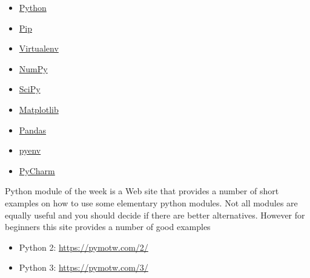 \begin{itemize}
\item \href{https://www.python.org/}{Python}
\item \href{https://pip.pypa.io/en/stable/}{Pip}
\item \href{https://virtualenv.pypa.io/en/stable/}{Virtualenv}
\item \href{http://www.numpy.org/}{NumPy}
\item \href{https://scipy.org/}{SciPy}
\item \href{http://matplotlib.org/}{Matplotlib}
\item \href{http://pandas.pydata.org/}{Pandas}
\item \href{https://github.com/pyenv/pyenv}{pyenv}
\item \href{https://github.com/pyenv/pyenv}{PyCharm}
\end{itemize}

Python module of the week is a Web site that provides a number of short
examples on how to use some elementary python modules. Not all modules
are equally useful and you should decide if there are better
alternatives. However for beginners this site provides a number of good
examples

\begin{itemize}

\item
  Python 2: \url{https://pymotw.com/2/}
\item
  Python 3: \url{https://pymotw.com/3/}
\end{itemize}
